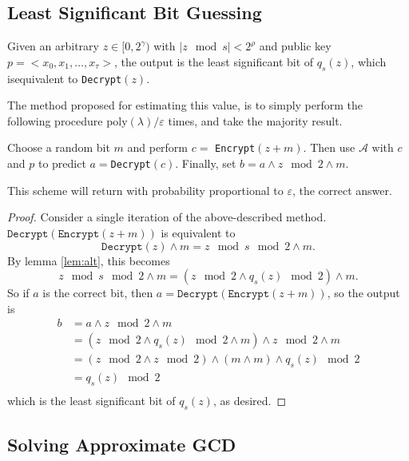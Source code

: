 \documentclass[a4paper,11pt, oneside]{article}
\begin{document}
\subsection{Least Significant Bit Guessing}
   Given an arbitrary $z\in[0,2^\gamma)$ with $|z\mod{s}| < 2^\rho$ and public key $p = <x_0,x_1,\dots,x_\tau>$, the output is the least significant bit of $q_s(z)$, which isequivalent to \texttt{Decrypt}$(z)$.

    The method proposed for estimating this value, is to simply perform the following procedure poly$(\lambda)/\varepsilon$ times, and take the majority result.

    Choose a random bit $m$ and perform $c = $ \texttt{Encrypt}$(z+m)$.  Then use $\mathcal{A}$ with $c$ and $p$ to predict $a = $\texttt{Decrypt}$(c)$.  Finally, set $b = a \wedge z\mod{2} \wedge m$.  
    
    This scheme will return with probability proportional to $\varepsilon$, the correct answer.

\begin{proof}
    Consider a single iteration of the above-described method.  $\texttt{Decrypt}(\texttt{Encrypt}(z+m))$ is equivalent to
    \[\texttt{Decrypt}(z)\wedge m = z\mod{s}\mod{2} \wedge m.\]
    By lemma \ref{lem:alt}, this becomes
    \[z\mod{s}\mod{2}\wedge m = \left(z\mod{2}\wedge q_s(z)\mod{2}\right) \wedge m.\]
    So if $a$ is the correct bit, then $a = \texttt{Decrypt}(\texttt{Encrypt}(z+m))$, so the output is
    \begin{align*}
        b &= a \wedge z\mod{2} \wedge m\\
        &=\left( z\mod{2}\wedge q_s(z)\mod{2}\wedge m\right)\wedge z\mod{2}\wedge m\\
        &=\left( z\mod{2}\wedge z\mod{2} \right)\wedge \left( m\wedge m \right) \wedge q_s(z)\mod{2}\\
        &= q_s(z)\mod{2}\\
    \end{align*}
    which is the least significant bit of $q_s(z)$, as desired.
\end{proof}

\subsection{Solving Approximate GCD}
\end{document}
